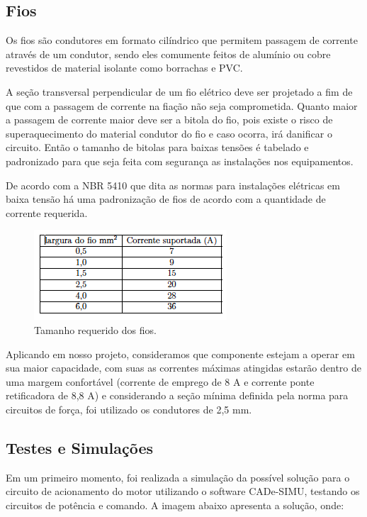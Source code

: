 \subsection{Fios}
Os fios são condutores em formato cilíndrico que permitem passagem de corrente através de um condutor, sendo eles comumente feitos de alumínio ou cobre revestidos de material isolante como borrachas e PVC.

A seção transversal perpendicular de um fio elétrico deve ser projetado a fim de que com a passagem de corrente na fiação não seja comprometida. Quanto maior a passagem de corrente maior deve ser a bitola do fio, pois existe o risco de superaquecimento do material condutor do fio e caso ocorra, irá danificar o circuito. Então o tamanho de bitolas para baixas tensões é tabelado e padronizado para que seja feita com segurança as instalações nos equipamentos.

De acordo com a NBR 5410 que dita as normas para instalações elétricas em baixa tensão há uma padronização de fios de acordo com a quantidade de corrente requerida.

\begin{figure}[!h]
	\centering
		\includegraphics[scale=0.7]{figuras/energia/16.png}
	\caption{Tamanho requerido dos fios.}
\end{figure}

Aplicando em nosso projeto, consideramos que componente estejam a operar em sua maior capacidade, com suas as correntes máximas atingidas estarão dentro de uma margem confortável (corrente de emprego de 8 A e corrente ponte retificadora de 8,8 A) e considerando a seção mínima definida pela norma para circuitos de força, foi utilizado os condutores de 2,5 mm.

\subsection{Testes e Simulações}
Em um primeiro momento, foi realizada a simulação da possível solução para o circuito de acionamento do motor utilizando o software CADe-SIMU, testando os circuitos de potência e comando. A imagem abaixo apresenta a solução, onde:


